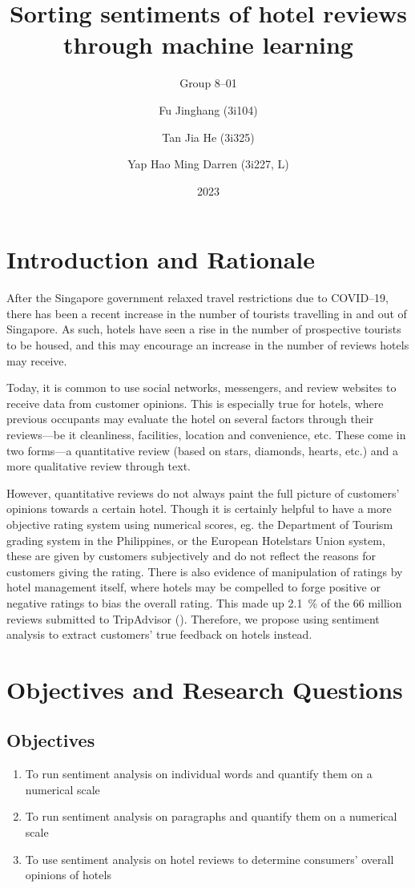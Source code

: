 \documentclass[12pt, bibliography=totocnumbered, paper=a4]{scrartcl}
\title{Sorting sentiments of hotel reviews through machine learning}
\subtitle{Group 8--01}
\author{
	Fu Jinghang (3i104) \and
	Tan Jia He (3i325) \and
	Yap Hao Ming Darren (3i227, L)
}
\date{2023}
\begin{document}
\onehalfspacing

\pagestyle{empty}
\maketitle
\tableofcontents
\pagebreak

\setcounter{page}{1}
\pagestyle{scrheadings}
\section{Introduction and Rationale}
After the Singapore government relaxed travel restrictions due to COVID--19,
there has been a recent increase in the number of tourists travelling in and out of Singapore.
As such, hotels have seen a rise in the number of prospective tourists to be housed,
and this may encourage an increase in the number of reviews hotels may receive.

Today, it is common to use social networks, messengers, and review websites
to receive data from customer opinions. This is especially true for hotels,
where previous occupants may evaluate the hotel on several factors through their
reviews---be it cleanliness, facilities, location and convenience, etc.
These come in two forms---a quantitative review (based on stars, diamonds, hearts, etc.)
and a more qualitative review through text.

However, quantitative reviews do not always paint the full picture of customers'
opinions towards a certain hotel. Though it is certainly helpful to have a more
objective rating system using numerical scores, eg. the Department of Tourism grading system in
the Philippines, or the European Hotelstars Union system,
these are given by customers subjectively and do not reflect the reasons for customers giving the rating.
There is also evidence of manipulation of ratings by hotel management itself, where hotels may be
compelled to forge positive or negative ratings to bias the overall rating.
This made up \qty{2.1}{\percent} of the 66 million reviews submitted to TripAdvisor (\cite{tripadvisor}).
Therefore, we propose using sentiment analysis to extract customers' true feedback on hotels instead.

\section{Objectives and Research Questions}
\subsection{Objectives}
\begin{enumerate}
	\item To run sentiment analysis on individual words and quantify them on a numerical scale
	\item To run sentiment analysis on paragraphs and quantify them on a numerical scale
	\item To use sentiment analysis on hotel reviews to determine consumers' overall opinions of hotels
\end{enumerate}
\end{document}
